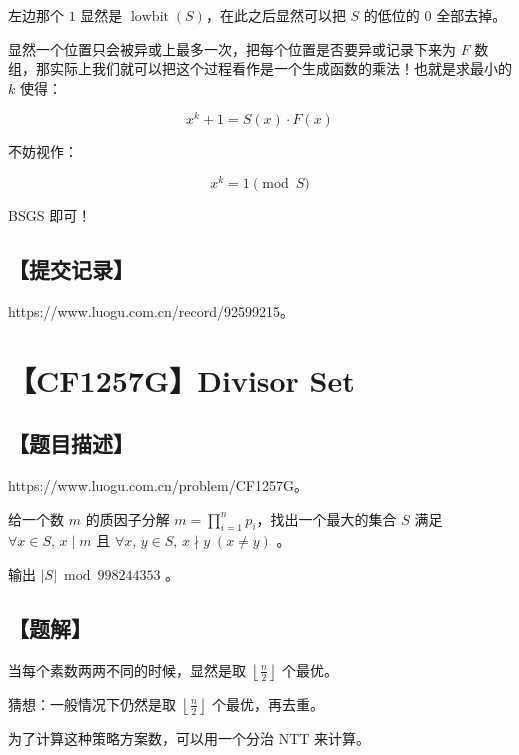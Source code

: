 \documentclass[UTF8,12pt,a4paper]{ctexart}
\begin{document}
	左边那个 $1$ 显然是 $\operatorname{lowbit}(S)$，在此之后显然可以把 $S$ 的低位的 $0$ 全部去掉。
	
	显然一个位置只会被异或上最多一次，把每个位置是否要异或记录下来为 $F$ 数组，那实际上我们就可以把这个过程看作是一个生成函数的乘法！也就是求最小的 $k$ 使得：
	
	$$
	x^k+1=S(x)\cdot F(x)
	$$
	
	不妨视作：
	
	$$
	x^k=1 \pmod{S}
	$$
	
	BSGS 即可！
	
	\subsection*{【提交记录】}
	
	https://www.luogu.com.cn/record/92599215。
	
	
	\section*{【CF1257G】Divisor Set}
	
	\subsection*{【题目描述】}
	
	https://www.luogu.com.cn/problem/CF1257G。
	
	给一个数 $m$ 的质因子分解 $m=\prod_{i=1}^np_i$，找出一个最大的集合 $S$ 满足 $\forall x\in S,\,x\mid m$ 且 $\forall x,\,y\in S,\,x\nmid y\;(x\neq y)$ 。
	
	输出 $|S|\bmod 998244353$ 。
	
	\subsection*{【题解】}
	
	当每个素数两两不同的时候，显然是取 $\left\lfloor\frac n2\right\rfloor$ 个最优。
	
	猜想：一般情况下仍然是取 $\left\lfloor\frac n2\right\rfloor$ 个最优，再去重。
	
	为了计算这种策略方案数，可以用一个分治 NTT 来计算。
	
\end{document}
